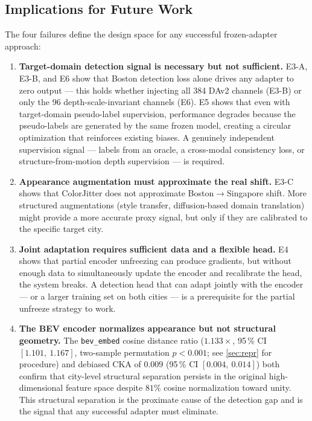 \documentclass[letterpaper, 10pt, journal]{IEEEtran}
\begin{document}
\subsection{Implications for Future Work}

The four failures define the design space for any successful frozen-adapter approach:

\begin{enumerate}
  \item \textbf{Target-domain detection signal is necessary but not sufficient.}
    E3-A, E3-B, and E6 show that Boston detection loss alone drives any adapter to
    zero output --- this holds whether injecting all 384 DAv2 channels (E3-B) or
    only the 96 depth-scale-invariant channels (E6).
    E5 shows that even with target-domain pseudo-label supervision, performance degrades
    because the pseudo-labels are generated by the same frozen model, creating a circular
    optimization that reinforces existing biases.
    A genuinely independent supervision signal --- labels from an oracle, a cross-modal
    consistency loss, or structure-from-motion depth supervision --- is required.

  \item \textbf{Appearance augmentation must approximate the real shift.}
    E3-C shows that ColorJitter does not approximate Boston$\to$Singapore shift.
    More structured augmentations (style transfer, diffusion-based domain translation)
    might provide a more accurate proxy signal, but only if they are calibrated to
    the specific target city.

  \item \textbf{Joint adaptation requires sufficient data and a flexible head.}
    E4 shows that partial encoder unfreezing can produce gradients, but without
    enough data to simultaneously update the encoder and recalibrate the head, the
    system breaks.
    A detection head that can adapt jointly with the encoder --- or a larger training
    set on both cities --- is a prerequisite for the partial unfreeze strategy to work.

  \item \textbf{The BEV encoder normalizes appearance but not structural geometry.}
    The \texttt{bev\_embed} cosine distance ratio ($1.133\times$, 95\,\% CI $[1.101,\
    1.167]$, two-sample permutation $p < 0.001$; see \cref{sec:repr} for procedure)
    and debiased CKA of $0.009$ (95\,\% CI $[0.004,\ 0.014]$)
    both confirm that city-level structural separation persists in the original
    high-dimensional feature space despite $81\%$ cosine normalization toward unity.
    This structural separation is the proximate cause of the detection gap and is the
    signal that any successful adapter must eliminate.
\end{enumerate}
\end{document}
